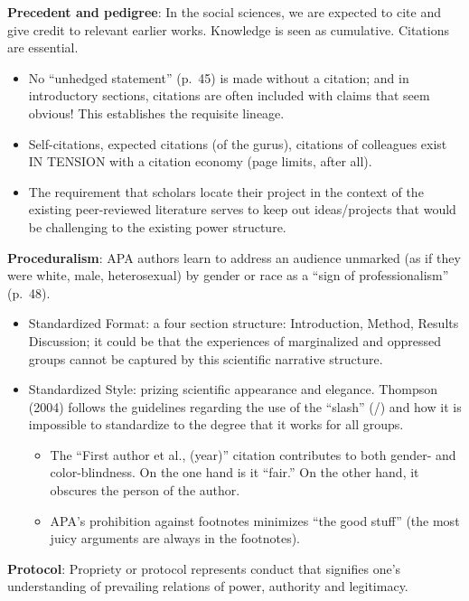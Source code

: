 \documentclass[
  11pt,
]{book}
\providecommand{\tightlist}{%
  \setlength{\itemsep}{0pt}\setlength{\parskip}{0pt}}
\begin{document}
\textbf{Precedent and pedigree}: In the social sciences, we are expected to cite and give credit to relevant earlier works. Knowledge is seen as cumulative. Citations are essential.

\begin{itemize}
\tightlist
\item
  No ``unhedged statement'' (p.~45) is made without a citation; and in introductory sections, citations are often included with claims that seem obvious! This establishes the requisite lineage.
\item
  Self-citations, expected citations (of the gurus), citations of colleagues exist IN TENSION with a citation economy (page limits, after all).
\item
  The requirement that scholars locate their project in the context of the existing peer-reviewed literature serves to keep out ideas/projects that would be challenging to the existing power structure.
\end{itemize}

\textbf{Proceduralism}: APA authors learn to address an audience unmarked (as if they were white, male, heterosexual) by gender or race as a ``sign of professionalism'' (p.~48).

\begin{itemize}
\tightlist
\item
  Standardized Format: a four section structure: Introduction, Method, Results Discussion; it could be that the experiences of marginalized and oppressed groups cannot be captured by this scientific narrative structure.
\item
  Standardized Style: prizing scientific appearance and elegance. Thompson (2004) follows the guidelines regarding the use of the ``slash'' (/) and how it is impossible to standardize to the degree that it works for all groups.

  \begin{itemize}
  \tightlist
  \item
    The ``First author et al., (year)'' citation contributes to both gender- and color-blindness. On the one hand is it ``fair.'' On the other hand, it obscures the person of the author.
  \item
    APA's prohibition against footnotes minimizes ``the good stuff'' (the most juicy arguments are always in the footnotes).
  \end{itemize}
\end{itemize}

\textbf{Protocol}: Propriety or protocol represents conduct that signifies one's understanding of prevailing relations of power, authority and legitimacy.
\end{document}
